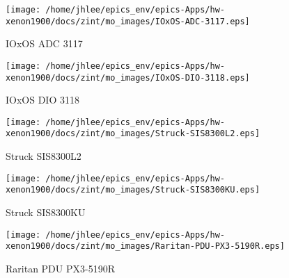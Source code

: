 \noindent
\vspace{1.4cm}
\begin{minipage}{.2\textwidth}
\begin{center}
\texttt{[image: /home/jhlee/epics\_env/epics-Apps/hw-xenon1900/docs/zint/mo\_images/IOxOS-ADC-3117.eps]}
\end{center}
\end{minipage}
\begin{minipage}{.7\textwidth}
IOxOS ADC 3117
\end{minipage}


\noindent
\vspace{1.4cm}
\begin{minipage}{.2\textwidth}
\begin{center}
\texttt{[image: /home/jhlee/epics\_env/epics-Apps/hw-xenon1900/docs/zint/mo\_images/IOxOS-DIO-3118.eps]}
\end{center}
\end{minipage}
\begin{minipage}{.7\textwidth}
IOxOS DIO 3118
\end{minipage}


\noindent
\vspace{1.4cm}
\begin{minipage}{.2\textwidth}
\begin{center}
\texttt{[image: /home/jhlee/epics\_env/epics-Apps/hw-xenon1900/docs/zint/mo\_images/Struck-SIS8300L2.eps]}
\end{center}
\end{minipage}
\begin{minipage}{.7\textwidth}
Struck SIS8300L2
\end{minipage}


\noindent
\vspace{1.4cm}
\begin{minipage}{.2\textwidth}
\begin{center}
\texttt{[image: /home/jhlee/epics\_env/epics-Apps/hw-xenon1900/docs/zint/mo\_images/Struck-SIS8300KU.eps]}
\end{center}
\end{minipage}
\begin{minipage}{.7\textwidth}
Struck SIS8300KU
\end{minipage}


\noindent
\vspace{1.4cm}
\begin{minipage}{.2\textwidth}
\begin{center}
\texttt{[image: /home/jhlee/epics\_env/epics-Apps/hw-xenon1900/docs/zint/mo\_images/Raritan-PDU-PX3-5190R.eps]}
\end{center}
\end{minipage}
\begin{minipage}{.7\textwidth}
Raritan PDU PX3-5190R
\end{minipage}


